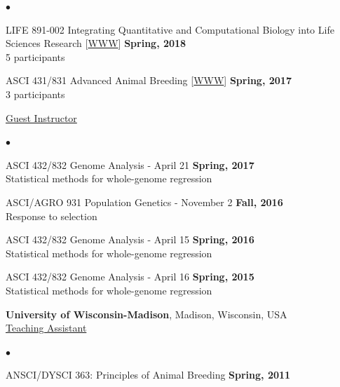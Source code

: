 \documentclass[margin,line,10pt]{res}
\newenvironment{list2}{
  \begin{list}{$\bullet$}{%
      \setlength{\itemsep}{0in}
      \setlength{\parsep}{0in} \setlength{\parskip}{0in}
      \setlength{\topsep}{0in} \setlength{\partopsep}{0in} 
      \setlength{\leftmargin}{0.2in}}}{\end{list}}
\begin{document}
\begin{resume}
\begin{list2}
  \vspace{0.5cm}

\item LIFE 891-002 Integrating Quantitative and Computational Biology into Life Sciences Research [\textcolor{blue}{\href{http://morotalab.org/life431-2018/life431-831.html}{WWW}}]
  \hfill {\bf Spring, 2018}  \\
 5 participants  

 \vspace{0.5cm}

\item ASCI 431/831 Advanced Animal Breeding [\textcolor{blue}{\href{http://morotalab.org/asci431-2017/ASCI431-831.html}{WWW}}]
  \hfill {\bf Spring, 2017}  \\
 3 participants 
\end{list2}

 \vspace{.01pt}

\underline{Guest Instructor}
 \vspace{0.4cm}
 \begin{list2}
 \item ASCI 432/832 Genome Analysis - April 21  \hfill {\bf Spring, 2017} \\
   Statistical methods for whole-genome regression
\vspace{0.5cm}
\item ASCI/AGRO 931  Population Genetics - November 2  \hfill {\bf Fall, 2016} \\
  Response to selection
\vspace{0.5cm}
\item ASCI 432/832 Genome Analysis - April 15  \hfill {\bf Spring, 2016} \\
  Statistical methods for whole-genome regression
\vspace{0.5cm}
\item ASCI 432/832 Genome Analysis - April 16    \hfill {\bf Spring, 2015} \\
  Statistical methods for whole-genome regression
\end{list2}


  \vspace{1cm}

 
{\bf University of Wisconsin-Madison}, Madison, Wisconsin, USA  \vspace{0.2cm}  \\
\underline{Teaching Assistant} 
 \vspace{0.4cm}
\begin{list2}
\item ANSCI/DYSCI 363: Principles of Animal Breeding    \hfill {\bf Spring, 2011}


\end{list2}
\end{resume}
\end{document}
